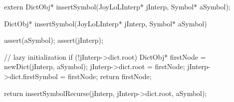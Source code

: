 \startCHeader
extern DictObj* insertSymbol(JoyLoLInterp* jInterp, Symbol* aSymbol);
\stopCHeader

\startCCode
DictObj* insertSymbol(JoyLoLInterp* jInterp, Symbol* aSymbol) {
  assert(aSymbol);
  assert(jInterp);

  // lazy initialization
  if (!jInterp->dict.root) {
    DictObj* firstNode = newDict(jInterp, aSymbol);
    jInterp->dict.root        = firstNode;
    jInterp->dict.firstSymbol = firstNode;
    return firstNode;
  }

  return insertSymbolRecurse(jInterp, jInterp->dict.root, aSymbol);
}
\stopCCode